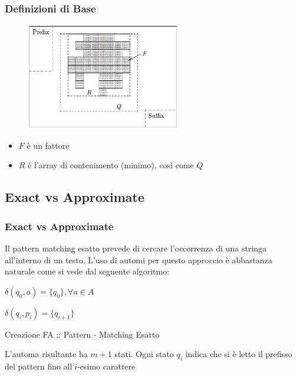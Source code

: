 \documentclass{beamer}
\begin{document}
\begin{frame}
\frametitle{Definizioni di Base}
\begin{figure}[p]
    \includegraphics[width=0.6\textwidth]{def.png}
\end{figure}
\begin{definition}
	\begin{itemize}
		\item $F$ è un fattore 
		\item $R$ è l'array di contenimento (minimo), così come $Q$
	\end{itemize}	
\end{definition}
\end{frame}

\subsection{Exact vs Approximate}

\begin{frame}
\frametitle{Exact vs Approximate}
Il pattern matching esatto prevede di cercare l'occorrenza di una stringa all'interno di un testo.
L'uso di automi per questo approccio è abbastanza naturale come si vede dal seguente algoritmo:\\
\begin{algorithm}[H]
\begin{algorithmic}[1]

\STATE $\delta(q_0,a) = \{q_0\} , \forall a \in A$\\



\STATE $\delta(q_i,p_{i}) = \{q_{i+1}\}$

\ENDFOR
\end{algorithmic}
\caption{Creazione FA :: Pattern - Matching Esatto}
\end{algorithm}

L'automa risultante ha $m+1$ stati. Ogni stato $q_i$ indica che si è letto il prefisso del pattern fino all'$i$-esimo carattere

\end{frame}
\end{document}
